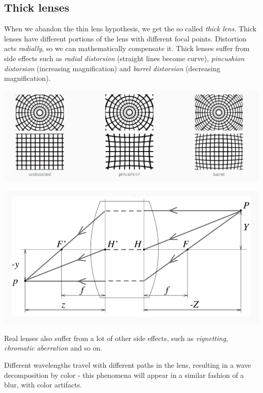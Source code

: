 \documentclass[10pt]{report}
\begin{document}
\subsection{Thick lenses}
\label{thick-lenses}
When we abandon the thin lens hypothesis, we get the so called \emph{thick
lens}. Thick lenses have different portions of the lens with different
focal points. Distortion acts \emph{radially}, so we can mathematically
compensate it. Thick lenses suffer from side effects such as \emph{radial
distorsion} (straight lines become curve), \emph{pincushion distorsion}
(increasing magnification) and \emph{barrel distorsion} (decreasing
magnification).

\begin{center}
\includegraphics[width=.9\linewidth]{./pics/visio/distortion.jpg}
\end{center}

\begin{center}
\includegraphics[width=.9\linewidth]{./pics/visio/thick-lens.jpg}
\end{center}

Real lenses also suffer from a lot of other side effects, such as
\emph{vignetting}, \emph{chromatic aberration} and so on.

Different wavelengths travel with different paths in the lens, resulting
in a wave decomposition by color - this phenomena will appear in a
similar fashion of a blur, with color artifacts.
\end{document}
